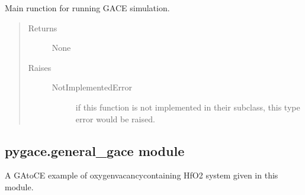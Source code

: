 \documentclass[letterpaper,10pt,english]{sphinxmanual}
\begin{document}
\begin{fulllineitems}
\begin{fulllineitems}
\begin{quote}
\begin{description}
\end{description}\end{quote}

\end{fulllineitems}


\begin{fulllineitems}
\label{\detokenize{pygace:pygace.gace.AbstractRunner.run}}
\sphinxAtStartPar
Main runction for running GACE simulation.
\begin{quote}\begin{description}
\item[{Returns}] \leavevmode\begin{description}
\item[{None}] \leavevmode
\end{description}

\item[{Raises}] \leavevmode\begin{description}
\item[{NotImplementedError}] \leavevmode
\sphinxAtStartPar
if this function is not implemented in their subclass, this type
error would be raised.

\end{description}

\end{description}\end{quote}

\end{fulllineitems}


\end{fulllineitems}



\subsection{pygace.general\_gace module}
\label{\detokenize{pygace:module-pygace.general_gace}}\label{\detokenize{pygace:pygace-general-gace-module}}
\sphinxAtStartPar
A GA\sphinxhyphen{}to\sphinxhyphen{}CE example of oxygen\sphinxhyphen{}vacancy\sphinxhyphen{}containing HfO2 system given in
this module.
\end{document}
